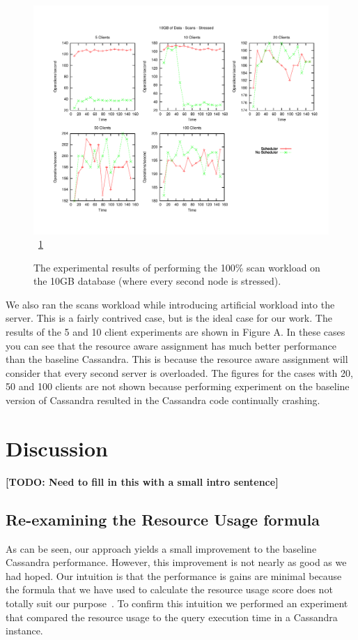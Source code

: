 \documentclass[]{acm_proc_article-sp}
\newcommand{\todo}[1]{\textbf{[TODO: #1]}}
\begin{document}
\begin{figure}[t]
\centering
\includegraphics[scale=0.5]{images/10GB_Scans_Stressed.pdf}
\vspace{-15pt}                                                                                                                                                                                                                 ~\ref{fig:10g_scans_stressed}
\caption{The experimental results of performing the 100\% scan workload on the 10GB database (where every second node is stressed).}
\label{fig:10g_scans_stressed}
\end{figure}

We also ran the scans workload while introducing artificial workload into the server. This is a fairly contrived case, but is the ideal case for our work. The results of the 5 and 10 client experiments are shown in Figure A. In these cases you can see that the resource aware assignment has much better performance than the baseline Cassandra. This is because the resource aware assignment will consider that every second server is overloaded. The figures for the cases with 20, 50 and 100 clients are not shown because performing experiment on the baseline version of Cassandra resulted in the Cassandra code continually crashing.

\section{Discussion}
\todo{Need to fill in this with a small intro sentence}

\subsection{Re-examining the Resource Usage formula}
As can be seen, our approach yields a small improvement to the baseline Cassandra performance. However, this improvement is not nearly as good as we had hoped. Our intuition is that the performance is gains are minimal because the formula that we have used to calculate the resource usage score does not totally suit our purpose~\cite{Gray and Black Box}. To confirm this intuition we performed an experiment that compared the resource usage to the query execution time in a Cassandra instance. 
\end{document}

